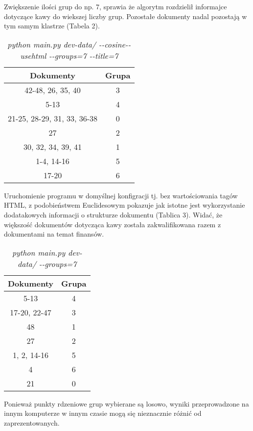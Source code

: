 \documentclass{article}
\begin{document}
Zwiększenie ilości grup do np. 7, sprawia że algorytm rozdzielił informajce dotyczące kawy do wiekszej liczby grup. Pozostałe dokumenty nadal pozostają w tym samym klastrze (Tabela 2).

\begin{table}[H]
\begin{center}
\begin{tabular}{ | c | c | }
\hline
Dokumenty & Grupa \\ \hline
42-48, 26, 35, 40 & 3 \\ \hline
5-13 & 4 \\ \hline
21-25, 28-29, 31, 33, 36-38 & 0 \\ \hline
27 & 2 \\ \hline
30, 32, 34, 39, 41 & 1 \\ \hline
1-4, 14-16 & 5 \\ \hline
17-20 & 6 \\ \hline
\end{tabular}
\caption{\emph{python main.py dev-data/ -{}-cosine-{}-usehtml -{}-groups=7 -{}-title=7}}
\end{center}
\end{table}

Uruchomienie programu w domyślnej konfigracji tj. bez wartościowania tagów HTML, z podobieństwem Euclidesowym pokazuje jak istotne jest wykorzystanie dodatakowych informacji o strukturze dokumentu (Tablica 3). Widać, że większość dokumentów dotycząca kawy została zakwalifikowana razem z dokumentami na temat finansów.

\begin{table}[H]
\begin{center}
\begin{tabular}{ | c | c | }
\hline
Dokumenty & Grupa \\ \hline
5-13 & 4 \\ \hline
17-20, 22-47 & 3 \\ \hline
48 & 1 \\ \hline
27 & 2 \\ \hline
1, 2, 14-16 & 5 \\ \hline
4 & 6 \\ \hline
21 & 0 \\ \hline
\end{tabular}
\caption{\emph{python main.py dev-data/ -{}-groups=7}}
\end{center}
\end{table}

Ponieważ punkty rdzeniowe grup wybierane są losowo, wyniki przeprowadzone na innym komputerze w innym czasie mogą się nieznacznie różnić od zaprezentowanych.
\end{document}

